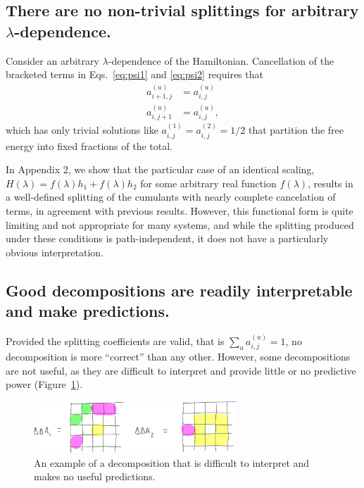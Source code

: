 \documentclass{article}
\begin{document}
\subsection{There are no non-trivial splittings for arbitrary $\lambda$-dependence.}

Consider an arbitrary $\lambda$-dependence of the Hamiltonian. Cancellation of the bracketed terms in Eqs.~\ref{eq:psi1} and \ref{eq:psi2} requires that
\begin{align*}
a_{i+1,j}^{(u)} &= a_{i,j}^{(u)} \\
a_{i,j+1}^{(u)} &= a_{i,j}^{(u)},
\end{align*}
which has only trivial solutions like $a_{i,j}^{(1)} = a_{i,j}^{(2)} = 1/2$ that partition the free energy into fixed fractions of the total.

In Appendix 2, we show that the particular case of an identical scaling, $H(\lambda) = f(\lambda)h_1 + f(\lambda)h_2$ for some arbitrary real function $f(\lambda)$, results in a well-defined splitting of the cumulants with nearly complete cancelation of terms, in agreement with previous results. However, this functional form is quite limiting and not appropriate for many systems, and while the splitting produced under these conditions is path-independent, it does not have a particularly obvious interpretation.








\subsection{Good decompositions are readily interpretable and make predictions.}

Provided the splitting coefficients are valid, that is $\sum_u a_{i,j}^{(u)}=1$, no decomposition is more ``correct'' than any other. However, some decompositions are not useful, as they are difficult to interpret and provide little or no predictive power (Figure~\ref{fig:bad_split}).

\begin{figure}[tb]
\centering
\includegraphics[width=3in]{figure6.pdf}
\caption{An example of a decomposition that is difficult to interpret and makes no useful predictions.}
\label{fig:bad_split}
\end{figure}
\end{document}
